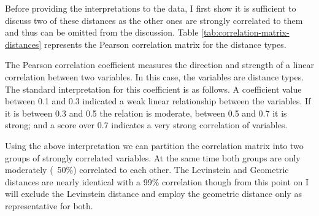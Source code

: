     Before providing the interpretations to the data, I first show it is sufficient to discuss two of these distances as the other ones are strongly correlated to them and thus can be omitted from the discussion. Table \ref{tab:correlation-matrix-distances} represents the Pearson correlation matrix for the distance types. 
    
    \begin{table}[!ht]
    \centering
    \caption{Pearson correlation coefficients for pairs of distance measure types}
    \label{tab:correlation-matrix-distances}
    \end{table}
    
    The Pearson correlation coefficient measures the direction and strength of a linear correlation between two variables. In this case, the variables are distance types. The standard interpretation for this coefficient is as follows. A coefficient value between 0.1 and 0.3 indicated a weak linear relationship between the variables. If it is between 0.3 and 0.5 the relation is moderate, between 0.5 and 0.7 it is strong; and a score over 0.7 indicates a very strong correlation of variables. 
    
    Using the above interpretation we can partition the correlation matrix into two groups of strongly correlated variables. At the same time both groups are only moderately (~50\%) correlated to each other. The Levinstein and Geometric distances are nearly identical with a 99\% correlation though from this point on I will exclude the Levinstein distance and employ the geometric distance only as representative for both. 
    
